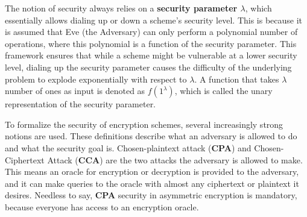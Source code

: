 The notion of security always relies on a \textbf{security parameter $\lambda$}, which essentially allows dialing up or down a scheme's security level. This is because it is assumed that Eve (the Adversary) can only perform a polynomial number of operations, where this polynomial is a function of the security parameter. This framework ensures that while a scheme might be vulnerable at a lower security level, dialing up the security parameter causes the difficulty of the underlying problem to explode exponentially with respect to $\lambda$. A function that takes $\lambda$ number of ones as input is denoted as $f(1^\lambda)$, which is called the unary representation of the security parameter.

To formalize the security of encryption schemes, several increasingly strong notions are used. These definitions describe what an adversary is allowed to do and what the security goal is. Chosen-plaintext attack (\textbf{CPA}) and Chosen-Ciphertext Attack (\textbf{CCA}) are the two attacks the adversary is allowed to make. This means an oracle for encryption or decryption is provided to the adversary, and it can make queries to the oracle with almost any ciphertext or plaintext it desires. Needless to say, \textbf{CPA} security in asymmetric encryption is mandatory, because everyone has access to an encryption oracle.





